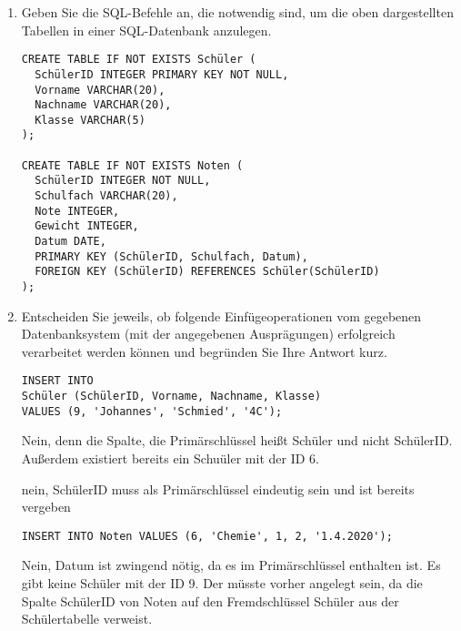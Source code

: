 \documentclass{lehramt-informatik-aufgabe}
\begin{document}
\begin{enumerate}


\item Geben Sie die SQL-Befehle an, die notwendig sind, um die oben
dargestellten Tabellen in einer SQL-Datenbank anzulegen.

\begin{antwort}
\begin{verbatim}
CREATE TABLE IF NOT EXISTS Schüler (
  SchülerID INTEGER PRIMARY KEY NOT NULL,
  Vorname VARCHAR(20),
  Nachname VARCHAR(20),
  Klasse VARCHAR(5)
);

CREATE TABLE IF NOT EXISTS Noten (
  SchülerID INTEGER NOT NULL,
  Schulfach VARCHAR(20),
  Note INTEGER,
  Gewicht INTEGER,
  Datum DATE,
  PRIMARY KEY (SchülerID, Schulfach, Datum),
  FOREIGN KEY (SchülerID) REFERENCES Schüler(SchülerID)
);
\end{verbatim}
\end{antwort}


\item Entscheiden Sie jeweils, ob folgende Einfügeoperationen vom
gegebenen Datenbanksystem (mit der angegebenen Ausprägungen) erfolgreich
verarbeitet werden können und begründen Sie Ihre Antwort kurz.

\begin{verbatim}
INSERT INTO
Schüler (SchülerID, Vorname, Nachname, Klasse)
VALUES (9, 'Johannes', 'Schmied', '4C');
\end{verbatim}

\begin{antwort}[richtig]
Nein, denn die Spalte, die Primärschlüssel heißt Schüler und nicht
SchülerID. Außerdem existiert bereits ein Schuüler mit der ID 6.
\end{antwort}

\begin{antwort}[muster]
nein, SchülerID muss als Primärschlüssel eindeutig sein und ist bereits vergeben
\end{antwort}

\begin{verbatim}
INSERT INTO Noten VALUES (6, 'Chemie', 1, 2, '1.4.2020');
\end{verbatim}

\begin{antwort}[richtig]
Nein, Datum ist zwingend nötig, da es im Primärschlüssel enthalten ist.
Es gibt keine Schüler mit der ID 9. Der müsste vorher angelegt sein,
da die Spalte SchülerID von Noten auf den Fremdschlüssel Schüler aus
der Schülertabelle verweist.
\end{antwort}


\end{enumerate}
\end{document}
